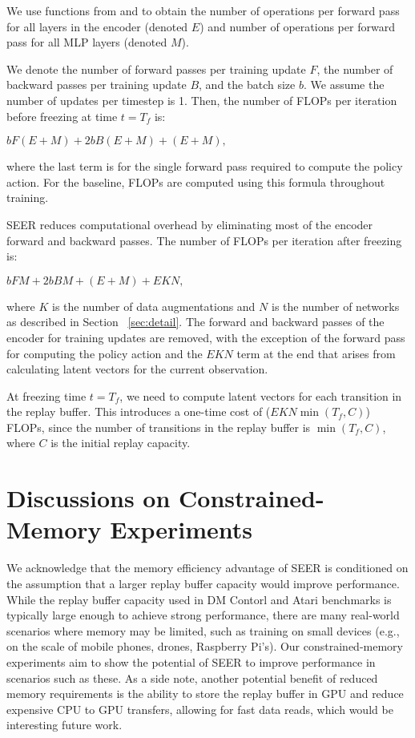 \documentclass{article}
\begin{document}
We use functions from \citet{huang2018condensenet} and \citet{jeong2019training} to obtain the number of operations per forward pass for all layers in the encoder (denoted $E$) and number of operations per forward pass for all MLP layers (denoted $M$). 

We denote the number of forward passes per training update $F$, the number of backward passes per training update $B$, and the batch size $b$. We assume the number of updates per timestep is 1. Then, the number of FLOPs per iteration before freezing at time $t=T_f$ is:
\begin{center}
    $bF(E + M) + 2bB(E + M) + (E + M),$
\end{center}
where the last term is for the single forward pass required to compute the policy action. For the baseline, FLOPs are computed using this formula throughout training.

SEER reduces computational overhead by eliminating most of the encoder forward and backward passes. The number of FLOPs per iteration after freezing is:
\begin{center}
    $bFM + 2bBM + (E + M) + EKN,$
\end{center}
where $K$ is the number of data augmentations and $N$ is the number of networks as described in Section ~\ref{sec:detail}. The forward and backward passes of the encoder for training updates are removed, with the exception of the forward pass for computing the policy action and the $EKN$ term at the end that arises from calculating latent vectors for the current observation.

At freezing time $t=T_f$, we need to compute latent vectors for each transition in the replay buffer. This introduces a one-time cost of ($EKN\min(T_f,C)$) FLOPs, since the number of transitions in the replay buffer is $\min(T_f,C)$, where $C$ is the initial replay capacity. 

\section{Discussions on Constrained-Memory Experiments} \label{appendix:memory_assumptions}

We acknowledge that the memory efficiency advantage of SEER is conditioned on the assumption that a larger replay buffer capacity would improve performance. While the replay buffer capacity used in DM Contorl and Atari benchmarks is typically large enough to achieve strong performance, there are many real-world scenarios where memory may be limited, such as training on small devices (e.g., on the scale of mobile phones, drones, Raspberry Pi's). Our constrained-memory experiments aim to show the potential of SEER to improve performance in scenarios such as these. As a side note, another potential benefit of reduced memory requirements is the ability to store the replay buffer in GPU and reduce expensive CPU to GPU transfers, allowing for fast data reads, which would be interesting future work.
\end{document}
